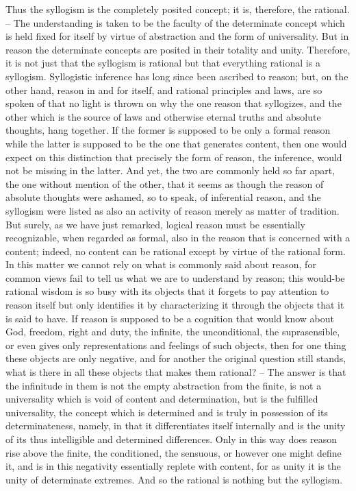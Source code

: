 Thus the syllogism is the completely posited concept; it is, therefore, the
rational. – The understanding is taken to be the faculty of the determinate
concept which is held fixed for itself by virtue of abstraction and the form
of universality. But in reason the determinate concepts are posited in their
totality and unity. Therefore, it is not just that the syllogism is rational but
that everything rational is a syllogism. Syllogistic inference has long since
been ascribed to reason; but, on the other hand, reason in and for itself,
and rational principles and laws, are so spoken of that no light is thrown
on why the one reason that syllogizes, and the other which is the source
of laws and otherwise eternal truths and absolute thoughts, hang together.
If the former is supposed to be only a formal reason while the latter is
supposed to be the one that generates content, then one would expect on
this distinction that precisely the form of reason, the inference, would not
be missing in the latter. And yet, the two are commonly held so far apart,
the one without mention of the other, that it seems as though the reason
of absolute thoughts were ashamed, so to speak, of inferential reason, and
the syllogism were listed as also an activity of reason merely as matter of
tradition. But surely, as we have just remarked, logical reason must be
essentially recognizable, when regarded as formal, also in the reason that
is concerned with a content; indeed, no content can be rational except
by virtue of the rational form. In this matter we cannot rely on what is
commonly said about reason, for common views fail to tell us what we are
to understand by reason; this would-be rational wisdom is so busy with its
objects that it forgets to pay attention to reason itself but only identifies it
by characterizing it through the objects that it is said to have. If reason is
supposed to be a cognition that would know about God, freedom, right and
duty, the infinite, the unconditional, the suprasensible, or even gives only
representations and feelings of such objects, then for one thing these objects
are only negative, and for another the original question still stands, what
is there in all these objects that makes them rational? – The answer is that
the infinitude in them is not the empty abstraction from the finite, is not a
universality which is void of content and determination, but is the fulfilled
universality, the concept which is determined and is truly in possession of its
determinateness, namely, in that it differentiates itself internally and is the
unity of its thus intelligible and determined differences. Only in this way
does reason rise above the finite, the conditioned, the sensuous, or however
one might define it, and is in this negativity essentially replete with content,
for as unity it is the unity of determinate extremes. And so the rational is
nothing but the syllogism.

